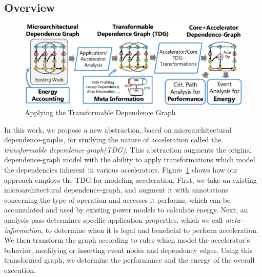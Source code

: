 \subsection{Overview}

\begin{figure}
  \begin{center}
    \includegraphics[width=0.77\linewidth]{figs/overview3.pdf}
  \end{center}
\vspace{-0.2in}
  \caption{Applying the Transformable Dependence Graph}
  \label{fig:overview}
\vspace{-0.05in}
\end{figure}

In this work, we propose a new abstraction, based on microarchitectural
dependence-graphs, for studying the nature of acceleration called the
\emph{transformable dependence-graph(TDG)}.  This abstraction augments the
original dependence-graph model with the ability to apply transformations
which model the dependencies inherent in various accelerators.
Figure~\ref{fig:overview} shows how our approach employs the TDG for modeling
acceleration.  First, we take an existing microarchitectural dependence-graph,
and augment it with annotations concerning the type of operation and accesses
it performs, which can be accumulated and used by existing power models to
calculate energy.  Next, an analysis pass determines specific application
properties, which we call \emph{meta-information}, to determine when it is
legal and beneficial to perform acceleration.  We then transform the graph
according to rules which model the accelerator's behavior, modifying or
inserting event nodes and dependency edges.  Using this transformed graph, we
determine the performance and the energy of the overall execution.



